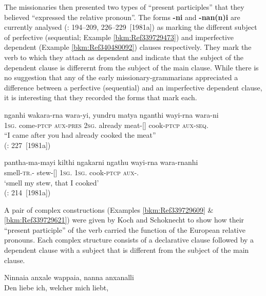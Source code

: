The missionaries then presented two types of “present participles” that they believed “expressed the relative pronoun''. The forms \textbf{-ni} and \textbf{-nan(n)i} are currently analysed (\citealt{austin_grammar_2013}: 194--209, 226--229~[1981a]) as marking the different subject of perfective (sequential; Example \ref{bkm:Ref339729473}) and imperfective dependent (Example \ref{bkm:Ref340480092}) clauses respectively. They mark the verb to which they attach as dependent and indicate that the subject of the dependent clause is differernt from the subject of the main clause. While there is no suggestion that any of the early missionary-grammarians appreciated a difference between a perfective (sequential) and an imperfective dependent clause, it is interesting that they recorded the forms that mark each.

\ea\label{bkm:Ref339729473}
\gll nganhi        wakara-rna     wara-yi,     yundru     matya    nganthi            wayi-rna      wara-ni\\
1\textsc{sg}.   come-\textsc{ptcp}     \textsc{aux}-\textsc{pres}   2\textsc{sg}.   already   meat-[]  cook-\textsc{ptcp} \textsc{aux}-\textsc{seq}.\\
\glt  “I came after you had already cooked the meat” \\
(\citealt{austin_grammar_2013}: 227~[1981a])
\z

\ea
\label{bkm:Ref340480092}
\gll pantha-ma-mayi          kilthi               ngakarni     ngathu     wayi-rna    wara-rnanhi\\
smell-\textsc{tr}.-   stew-[]  1\textsc{sg}.    1\textsc{sg}.    cook-\textsc{ptcp}    \textsc{aux}-.\\
\glt `smell my stew, that I cooked' \\
(\citealt{austin_grammar_2013}: 214~[1981a])
\z

A pair of complex constructions (Examples \ref{bkm:Ref339729609} \& \ref{bkm:Ref339729621}) were given by Koch and Schoknecht to show how their “present participle” of the verb carried the function of the European relative pronouns. Each complex structure consists of a declarative clause followed by a dependent clause with a subject that is different from the subject of the main clause.


\ea
   \label{bkm:Ref339729609}Ninnaia     anxale     wappaia,     nanna   anxanalli\\
    Den liebe ich, welcher mich liebt,\\

